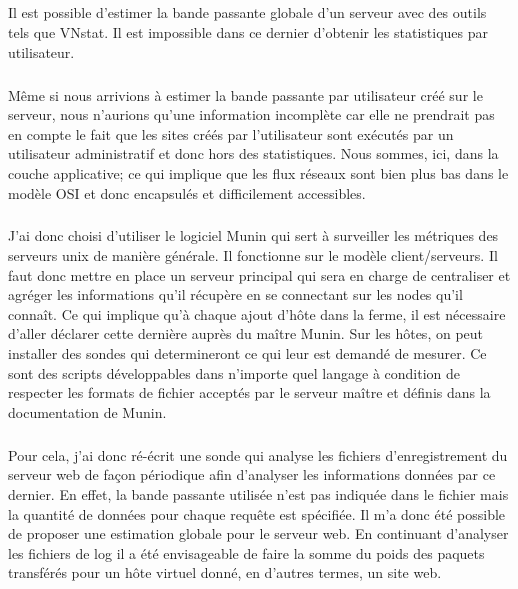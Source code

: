 \documentclass[11pt, a4paper ]{article}
\begin{document}
\begin{spacing}{1.5}
\subparagraph{}
Il est possible d'estimer la bande passante globale d'un serveur avec des outils tels que VNstat. Il est impossible dans ce dernier d'obtenir les statistiques par utilisateur.
%
\subparagraph{}
Même si nous arrivions à estimer la bande passante par utilisateur créé sur le serveur, nous n'aurions qu'une information incomplète car elle ne prendrait pas en compte le fait que les sites créés par l'utilisateur sont exécutés par un utilisateur administratif et donc hors des statistiques. Nous sommes, ici, dans la couche applicative; ce qui implique que les flux réseaux sont bien plus bas dans le modèle OSI et donc encapsulés et difficilement accessibles.
\subparagraph{}
J'ai donc choisi d’utiliser le logiciel Munin qui sert à surveiller les métriques des serveurs unix de manière générale. Il fonctionne sur le modèle client/serveurs. Il faut donc mettre en place un serveur principal qui sera en charge de centraliser et agréger les informations qu'il récupère en se connectant sur les nodes qu'il connaît. Ce qui implique qu'à chaque ajout d'hôte dans la ferme, il est nécessaire d'aller déclarer cette dernière auprès du maître Munin.
Sur les hôtes, on peut installer des sondes qui determineront ce qui leur est demandé de mesurer. Ce sont des scripts développables dans n'importe quel langage à condition de respecter les formats de fichier acceptés par le serveur maître et définis dans la documentation de Munin.
\subparagraph{}
Pour cela, j'ai donc ré-écrit une sonde qui analyse les fichiers d'enregistrement du serveur web de façon périodique afin d'analyser les informations données par ce dernier. En effet, la bande passante utilisée n'est pas indiquée dans le fichier mais la quantité de données pour chaque requête est spécifiée. Il m'a donc été possible de proposer une estimation globale pour le serveur web. En continuant d’analyser les fichiers de log il a été envisageable de faire la somme du poids des paquets transférés pour un hôte virtuel donné, en d'autres termes, un site web.

\end{spacing}
\end{document}
